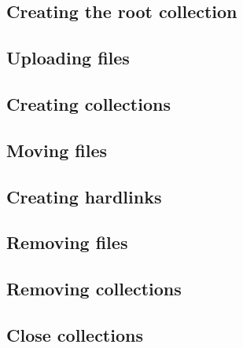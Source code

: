 \documentclass{book}
\begin{document}

\subsection{Creating the root collection} %
\label{sub:creating_the_root_collection}


\subsection{Uploading files} %
\label{sub:uploading_files}


\subsection{Creating collections} %
\label{sub:creating_collections}


\subsection{Moving files} %
\label{sub:moving_files}


\subsection{Creating hardlinks} %
\label{sub:creating_hardlinks}


\subsection{Removing files} %
\label{sub:removing_files}


\subsection{Removing collections} %
\label{sub:removing_collections}


\subsection{Close collections} %
\label{sub:close_collections}
\end{document}
